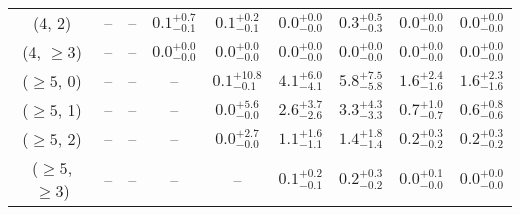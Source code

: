 \begin{table}[h!]
{\begin{tabular}{ccccccccc}
	(4, 2) & -- & -- & $0.1^{+ 0.7 }_{- 0.1 }$ & $0.1^{+ 0.2 }_{- 0.1 }$ & $0.0^{+ 0.0 }_{- 0.0 }$ & $0.3^{+ 0.5 }_{- 0.3 }$ & $0.0^{+ 0.0 }_{- 0.0 }$ & $0.0^{+ 0.0 }_{- 0.0 }$ \\[0.5ex] 
	(4, $\ge3$) & -- & -- & $0.0^{+ 0.0 }_{- 0.0 }$ & $0.0^{+ 0.0 }_{- 0.0 }$ & $0.0^{+ 0.0 }_{- 0.0 }$ & $0.0^{+ 0.0 }_{- 0.0 }$ & $0.0^{+ 0.0 }_{- 0.0 }$ & $0.0^{+ 0.0 }_{- 0.0 }$ \\[0.5ex] 
	($\ge5$, 0) & -- & -- & -- & $0.1^{+ 10.8 }_{- 0.1 }$ & $4.1^{+ 6.0 }_{- 4.1 }$ & $5.8^{+ 7.5 }_{- 5.8 }$ & $1.6^{+ 2.4 }_{- 1.6 }$ & $1.6^{+ 2.3 }_{- 1.6 }$ \\[0.5ex] 
	($\ge5$, 1) & -- & -- & -- & $0.0^{+ 5.6 }_{- 0.0 }$ & $2.6^{+ 3.7 }_{- 2.6 }$ & $3.3^{+ 4.3 }_{- 3.3 }$ & $0.7^{+ 1.0 }_{- 0.7 }$ & $0.6^{+ 0.8 }_{- 0.6 }$ \\[0.5ex] 
	($\ge5$, 2) & -- & -- & -- & $0.0^{+ 2.7 }_{- 0.0 }$ & $1.1^{+ 1.6 }_{- 1.1 }$ & $1.4^{+ 1.8 }_{- 1.4 }$ & $0.2^{+ 0.3 }_{- 0.2 }$ & $0.2^{+ 0.3 }_{- 0.2 }$ \\[0.5ex] 
	($\ge5$, $\ge3$) & -- & -- & -- & -- & $0.1^{+ 0.2 }_{- 0.1 }$ & $0.2^{+ 0.3 }_{- 0.2 }$ & $0.0^{+ 0.1 }_{- 0.0 }$ & $0.0^{+ 0.0 }_{- 0.0 }$ \\[0.5ex] 
	\hline
	\hline
\end{tabular}}
\end{table}
